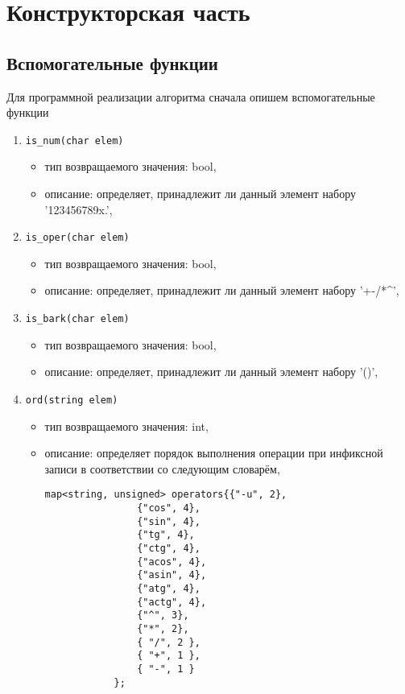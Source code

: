 \chapter{Конструкторская часть}

\section{Вспомогательные функции} 
Для программной реализации алгоритма сначала опишем вспомогательные функции
\begin{enumerate}
	\item \texttt{is\_num(char elem)}
	\begin{itemize}
		\item тип возвращаемого значения: bool,
		\item описание: определяет, принадлежит ли данный элемент набору '123456789x.',
	\end{itemize}
	
	\item \texttt{is\_oper(char elem)}
	\begin{itemize}
		\item тип возвращаемого значения: bool,
		\item описание: определяет, принадлежит ли данный элемент набору '+-/*\^{}',
	\end{itemize}
	
	\item \texttt{is\_bark(char elem)}
	\begin{itemize}
		\item тип возвращаемого значения: bool,
		\item описание: определяет, принадлежит ли данный элемент набору '()',
	\end{itemize}
	
	\item \texttt{ord(string elem)}
	\begin{itemize}
		\item тип возвращаемого значения: int,
		\item описание: определяет порядок выполнения операции при инфиксной записи в соответствии со следующим словарём,
		\begin{lstlisting}[label = list1, caption = словарь с порядками операций]
			map<string, unsigned> operators{{"-u", 2},
				{"cos", 4},
				{"sin", 4},
				{"tg", 4},
				{"ctg", 4},
				{"acos", 4},
				{"asin", 4},
				{"atg", 4},
				{"actg", 4},
				{"^", 3},
				{"*", 2},
				{ "/", 2 },
				{ "+", 1 },
				{ "-", 1 }
			};
        \end{lstlisting}
	\end{itemize}
	

\end{enumerate}
